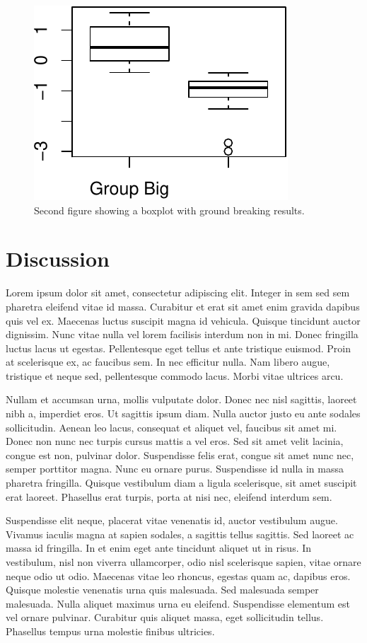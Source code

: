 \documentclass[10pt,a4paper,twocolumn]{article}
\begin{document}
\begin{figure}[htbp]
\centering
\includegraphics{./F1000Research_files/figure-latex/Fig2.pdf}
\caption{Second figure showing a boxplot with ground breaking results.
\label{fig:Fig2}}
\end{figure}

\section{Discussion}\label{discussion}

Lorem ipsum dolor sit amet, consectetur adipiscing elit. Integer in sem
sed sem pharetra eleifend vitae id massa. Curabitur et erat sit amet
enim gravida dapibus quis vel ex. Maecenas luctus suscipit magna id
vehicula. Quisque tincidunt auctor dignissim. Nunc vitae nulla vel lorem
facilisis interdum non in mi. Donec fringilla luctus lacus ut egestas.
Pellentesque eget tellus et ante tristique euismod. Proin at scelerisque
ex, ac faucibus sem. In nec efficitur nulla. Nam libero augue, tristique
et neque sed, pellentesque commodo lacus. Morbi vitae ultrices arcu.

Nullam et accumsan urna, mollis vulputate dolor. Donec nec nisl
sagittis, laoreet nibh a, imperdiet eros. Ut sagittis ipsum diam. Nulla
auctor justo eu ante sodales sollicitudin. Aenean leo lacus, consequat
et aliquet vel, faucibus sit amet mi. Donec non nunc nec turpis cursus
mattis a vel eros. Sed sit amet velit lacinia, congue est non, pulvinar
dolor. Suspendisse felis erat, congue sit amet nunc nec, semper
porttitor magna. Nunc eu ornare purus. Suspendisse id nulla in massa
pharetra fringilla. Quisque vestibulum diam a ligula scelerisque, sit
amet suscipit erat laoreet. Phasellus erat turpis, porta at nisi nec,
eleifend interdum sem.

Suspendisse elit neque, placerat vitae venenatis id, auctor vestibulum
augue. Vivamus iaculis magna at sapien sodales, a sagittis tellus
sagittis. Sed laoreet ac massa id fringilla. In et enim eget ante
tincidunt aliquet ut in risus. In vestibulum, nisl non viverra
ullamcorper, odio nisl scelerisque sapien, vitae ornare neque odio ut
odio. Maecenas vitae leo rhoncus, egestas quam ac, dapibus eros. Quisque
molestie venenatis urna quis malesuada. Sed malesuada semper malesuada.
Nulla aliquet maximus urna eu eleifend. Suspendisse elementum est vel
ornare pulvinar. Curabitur quis aliquet massa, eget sollicitudin tellus.
Phasellus tempus urna molestie finibus ultricies.
\end{document}
